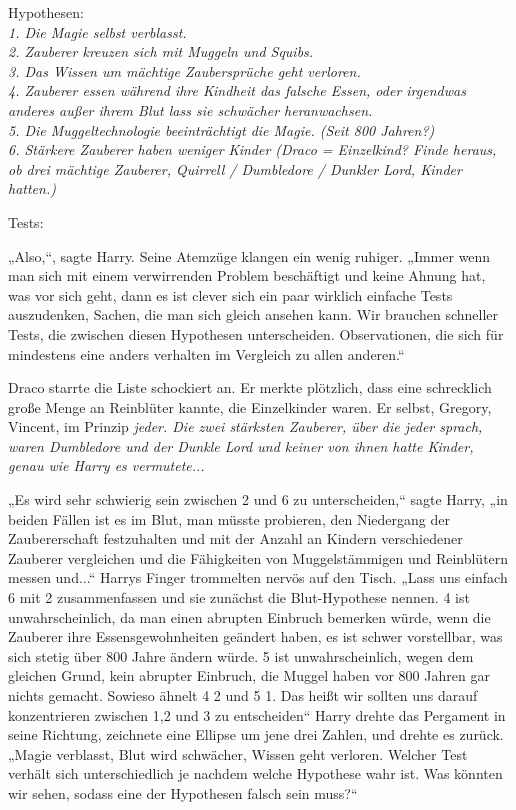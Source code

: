 {Hypothesen:\\ \emph{1\emph{. Die Magie selbst verblasst.}}\\ \emph{2. Zauberer \emph{kreuzen sich mit Muggeln und Squibs.}}\\ \emph{3. Das Wissen um mächtige Zaubersprüche geht verloren.}\\ \emph{4. Zauberer essen während ihre Kindheit das falsche Essen, oder irgendwas anderes außer ihrem Blut lass sie schwächer heranwachsen.}\\ \emph{5. Die Muggeltechnologie beeinträchtigt die Magie. (Seit 800 Jahren?)}\\ \emph{6. Stärkere Zauberer haben weniger Kinder (Draco = Einzelkind? Finde heraus, ob drei mächtige Zauberer, Quirrell / Dumbledore / Dunkler Lord, Kinder hatten.)}

Tests:

„Also,“, sagte Harry. Seine Atemzüge klangen ein wenig ruhiger. „Immer wenn man sich mit einem verwirrenden Problem beschäftigt und keine Ahnung hat, was vor sich geht, dann es ist clever sich ein paar wirklich einfache Tests auszudenken, Sachen, die man sich gleich ansehen kann. Wir brauchen schneller Tests, die zwischen diesen Hypothesen unterscheiden. Observationen, die sich für mindestens eine anders verhalten im Vergleich zu allen anderen.“

Draco starrte die Liste schockiert an. Er merkte plötzlich, dass eine schrecklich große Menge an Reinblüter kannte, die Einzelkinder waren. Er selbst, Gregory, Vincent, im Prinzip \emph{jeder. Die zwei stärksten Zauberer, über die jeder sprach, waren Dumbledore und der Dunkle Lord und keiner von ihnen hatte Kinder, genau wie Harry es vermutete...}

„Es wird sehr schwierig sein zwischen 2 und 6 zu unterscheiden,“ sagte Harry, „in beiden Fällen ist es im Blut, man müsste probieren, den Niedergang der Zaubererschaft festzuhalten und mit der Anzahl an Kindern verschiedener Zauberer vergleichen und die Fähigkeiten von Muggelstämmigen und Reinblütern messen und...“ Harrys Finger trommelten nervös auf den Tisch. „Lass uns einfach 6 mit 2 zusammenfassen und sie zunächst die Blut-Hypothese nennen. 4 ist unwahrscheinlich, da man einen abrupten Einbruch bemerken würde, wenn die Zauberer ihre Essensgewohnheiten geändert haben, es ist schwer vorstellbar, was sich stetig über 800 Jahre ändern würde. 5 ist unwahrscheinlich, wegen dem gleichen Grund, kein abrupter Einbruch, die Muggel haben vor 800 Jahren gar nichts gemacht. Sowieso ähnelt 4 2 und 5 1. Das heißt wir sollten uns darauf konzentrieren zwischen 1,2 und 3 zu entscheiden“ Harry drehte das Pergament in seine Richtung, zeichnete eine Ellipse um jene drei Zahlen, und drehte es zurück. „Magie verblasst, Blut wird schwächer, Wissen geht verloren. Welcher Test verhält sich unterschiedlich je nachdem welche Hypothese wahr ist. Was könnten wir sehen, sodass eine der Hypothesen falsch sein muss?“

}
